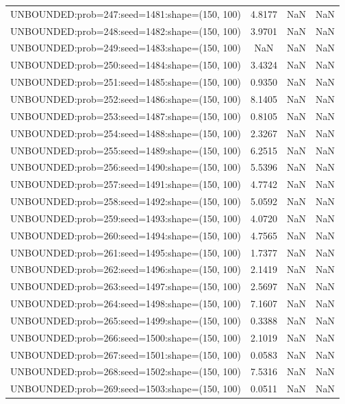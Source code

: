 \begin{longtable}{lccc}
UNBOUNDED:prob=247:seed=1481:shape=(150, 100) &  4.8177 &   NaN &    NaN \\
UNBOUNDED:prob=248:seed=1482:shape=(150, 100) &  3.9701 &   NaN &    NaN \\
UNBOUNDED:prob=249:seed=1483:shape=(150, 100) &     NaN &   NaN &    NaN \\
UNBOUNDED:prob=250:seed=1484:shape=(150, 100) &  3.4324 &   NaN &    NaN \\
UNBOUNDED:prob=251:seed=1485:shape=(150, 100) &  0.9350 &   NaN &    NaN \\
UNBOUNDED:prob=252:seed=1486:shape=(150, 100) &  8.1405 &   NaN &    NaN \\
UNBOUNDED:prob=253:seed=1487:shape=(150, 100) &  0.8105 &   NaN &    NaN \\
UNBOUNDED:prob=254:seed=1488:shape=(150, 100) &  2.3267 &   NaN &    NaN \\
UNBOUNDED:prob=255:seed=1489:shape=(150, 100) &  6.2515 &   NaN &    NaN \\
UNBOUNDED:prob=256:seed=1490:shape=(150, 100) &  5.5396 &   NaN &    NaN \\
UNBOUNDED:prob=257:seed=1491:shape=(150, 100) &  4.7742 &   NaN &    NaN \\
UNBOUNDED:prob=258:seed=1492:shape=(150, 100) &  5.0592 &   NaN &    NaN \\
UNBOUNDED:prob=259:seed=1493:shape=(150, 100) &  4.0720 &   NaN &    NaN \\
UNBOUNDED:prob=260:seed=1494:shape=(150, 100) &  4.7565 &   NaN &    NaN \\
UNBOUNDED:prob=261:seed=1495:shape=(150, 100) &  1.7377 &   NaN &    NaN \\
UNBOUNDED:prob=262:seed=1496:shape=(150, 100) &  2.1419 &   NaN &    NaN \\
UNBOUNDED:prob=263:seed=1497:shape=(150, 100) &  2.5697 &   NaN &    NaN \\
UNBOUNDED:prob=264:seed=1498:shape=(150, 100) &  7.1607 &   NaN &    NaN \\
UNBOUNDED:prob=265:seed=1499:shape=(150, 100) &  0.3388 &   NaN &    NaN \\
UNBOUNDED:prob=266:seed=1500:shape=(150, 100) &  2.1019 &   NaN &    NaN \\
UNBOUNDED:prob=267:seed=1501:shape=(150, 100) &  0.0583 &   NaN &    NaN \\
UNBOUNDED:prob=268:seed=1502:shape=(150, 100) &  7.5316 &   NaN &    NaN \\
UNBOUNDED:prob=269:seed=1503:shape=(150, 100) &  0.0511 &   NaN &    NaN \\

\end{longtable}

